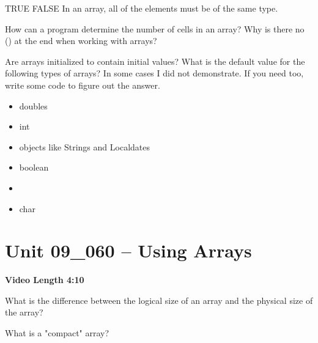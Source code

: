 \documentclass[letterpaper,12pt]{exam}
\newcommand{\unit}{Unit 09}
\begin{document}
\begin{questions}
\begin{samepage}
    \question TRUE  FALSE  In an array, all of the elements must be of the same type.
    \vspace{5mm}
\end{samepage}

\begin{samepage}
    \question How can a program determine the number of cells in an array?  Why is there no () at the end when working with arrays?
    \vspace{5mm}
\end{samepage}

\clearpage
\begin{samepage}
    \question Are arrays initialized to contain initial values?  What is the default value for the following types of arrays?  In some cases I did not demonstrate.  If you need too, write some code to figure out the answer.
    
    \begin{itemize}
        \item doubles
        \vspace{5mm}
        \item int
        \vspace{5mm}
        \item objects like Strings and Localdates
        \vspace{5mm}
        \item boolean
        \item \vspace{5mm}
        \item char
        \vspace{5mm}
    \end{itemize}
    
\end{samepage}

\section*{\unit\_060 -- Using Arrays} 
\par{\selectfont\textbf{Video Length 4:10}}
\begin{samepage}
    \question What is the difference between the logical size of an array and the physical size of the array?
    \vspace{5mm}
\end{samepage}

\begin{samepage}
    \question What is a "compact" array?
    \vspace{5mm}
\end{samepage}


\end{questions}
\end{document}
